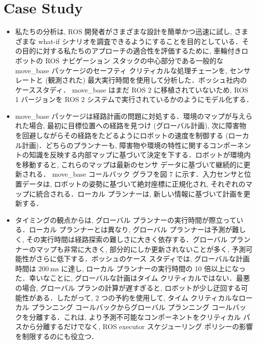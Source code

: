 
\section{Case Study}
\label{sec: case study}

\begin{frame}{}
    \begin{itemize}
        \item 私たちの分析は, ROS 開発者がさまざまな設計を簡単かつ迅速に試し, さまざまな what-if シナリオを調査できるようにすることを目的としている．その目的に対する私たちのアプローチの適合性を評価するために, 車輪付きロボットの ROS ナビゲーション スタックの中心部分である一般的な move\_base パッケージのセーフティ クリティカルな処理チェーンを, センサ レートと (観測された) 最大実行時間を使用して分析した．ボッシュ社内のケーススタディ． move\_base はまだ ROS 2 に移植されていないため, ROS 1 バージョンを ROS 2 システムで実行されているかのようにモデル化する．
    \end{itemize}
\end{frame}

\begin{frame}{}
    \begin{itemize}
        \item move\_base パッケージは経路計画の問題に対処する．環境のマップが与えられた場合, 最初に目標位置への経路を見つけ (グローバル計画), 次に障害物を回避しながらその経路をたどるようにロボットの速度を制御する (ローカル計画)．どちらのプランナーも, 障害物や環境の特性に関するコンポーネントの知識を反映する内部マップに基づいて決定を下する．ロボットが環境内を移動すると, これらのマップは最新のセンサ データに基づいて継続的に更新される． move\_base コールバック グラフを図 7 に示す．入力センサと位置データは, ロボットの姿勢に基づいて絶対座標に正規化され, それぞれのマップに統合される．ローカル プランナーは, 新しい情報に基づいて計画を更新する．
    \end{itemize}
\end{frame}

\begin{frame}{}
    \begin{itemize}
        \item タイミングの観点からは, グローバル プランナーの実行時間が際立っている．ローカル プランナーとは異なり, グローバル プランナーは予測が難しく, その実行時間は経路探索の難しさに大きく依存する．グローバル プランナーのマップも非常に大きく, 部分的にしか更新されないことが多く, 予測可能性がさらに低下する．ボッシュのケース スタディでは, グローバルな計画時間は $200 \mathrm{~ms}$ に達し, ローカル プランナーの実行時間の 10 倍以上になった．幸いなことに, グローバルな計画はタイム クリティカルではない．最悪の場合, グローバル プランの計算が遅すぎると, ロボットが少し迂回する可能性がある．したがって, 2 つの予約を使用して, タイム クリティカルなローカル プランニング コールバックからグローバル プランニング コールバックを分離する．これは, より予測不可能なコンポーネントをクリティカル パスから分離するだけでなく, ROS executor スケジューリング ポリシーの影響を制限するのにも役立つ．
    \end{itemize}
\end{frame}

